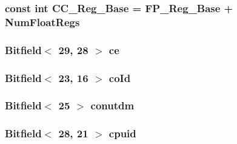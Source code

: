 \label{namespaceMipsISA_a297386c6b4091f227ba72fe86f438239}
\hypertarget{namespaceMipsISA_ab1d4916ec3ee18e808b3452603742d38}{
\subsubsection[{CC\_\-Reg\_\-Base}]{\setlength{\rightskip}{0pt plus 5cm}const int {\bf CC\_\-Reg\_\-Base} = {\bf FP\_\-Reg\_\-Base} + {\bf NumFloatRegs}}}
\label{namespaceMipsISA_ab1d4916ec3ee18e808b3452603742d38}
\hypertarget{namespaceMipsISA_a5e7d4c894937b23c448e900d42f68004}{
\subsubsection[{ce}]{\setlength{\rightskip}{0pt plus 5cm}Bitfield$<$ 29, 28 $>$ {\bf ce}}}
\label{namespaceMipsISA_a5e7d4c894937b23c448e900d42f68004}
\hypertarget{namespaceMipsISA_af4cff68366aa37c9a785427632809abc}{
\subsubsection[{coId}]{\setlength{\rightskip}{0pt plus 5cm}Bitfield$<$ 23, 16 $>$ {\bf coId}}}
\label{namespaceMipsISA_af4cff68366aa37c9a785427632809abc}
\hypertarget{namespaceMipsISA_a140c882200add713056d43320ae90ee7}{
\subsubsection[{conutdm}]{\setlength{\rightskip}{0pt plus 5cm}Bitfield$<$ 25 $>$ {\bf conutdm}}}
\label{namespaceMipsISA_a140c882200add713056d43320ae90ee7}
\hypertarget{namespaceMipsISA_adf9c6967cc711b5d52e708d9be20ebb7}{
\subsubsection[{coOp}]{}}
\label{namespaceMipsISA_adf9c6967cc711b5d52e708d9be20ebb7}
\hypertarget{namespaceMipsISA_ad8c57e94aa3e790a8d7259e5b798123b}{
\subsubsection[{cpuid}]{\setlength{\rightskip}{0pt plus 5cm}Bitfield$<$ 28, 21 $>$ {\bf cpuid}}}

